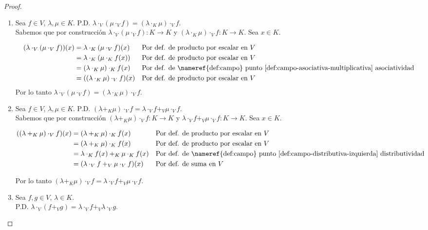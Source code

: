 \begin{proof}
\begin{enumerate}
        \item Sea $f \in V$, $\lambda, \mu \in K$. P.D. $\lambda \cdot_V (\mu \cdot_V f) = (\lambda \cdot_K \mu) \cdot_V f$.\\
        Sabemos que por construcción $\lambda \cdot_V (\mu \cdot_V f): K \rightarrow K$ y $(\lambda \cdot_K \mu) \cdot_V f: K \rightarrow K$. Sea $x \in K$.

        \begin{align*}
            (\lambda \cdot_V (\mu \cdot_V f))(x)  &= \lambda \cdot_K (\mu \cdot_V f)(x) && \text{Por def. de producto por escalar en $V$} \\
            &= \lambda \cdot_K (\mu \cdot_K f(x)) && \text{Por def. de producto por escalar en $V$} \\
            &= (\lambda \cdot_K \mu) \cdot_K f(x) && \text{Por def. de \nameref{def:campo} punto \ref{def:campo-asociativa-multiplicativa} asociatividad} \\
            &= ((\lambda \cdot_K \mu) \cdot_V f)(x) && \text{Por def. de producto por escalar en $V$}
        \end{align*}
        Por lo tanto $\lambda \cdot_V (\mu \cdot_V f) = (\lambda \cdot_K \mu) \cdot_V f$.


        \item Sea $f \in V$, $\lambda, \mu \in K$. P.D. $(\lambda +_K \mu) \cdot_V f = \lambda \cdot_V f +_V \mu \cdot_V f$.\\
        Sabemos que por construcción $(\lambda +_K \mu) \cdot_V f: K \rightarrow K$ y $\lambda \cdot_V f +_V \mu \cdot_V f: K \rightarrow K$. Sea $x \in K$.

        \begin{align*}
            ((\lambda +_K \mu) \cdot_V f)(x) &= (\lambda +_K \mu) \cdot_K f(x) && \text{Por def. de producto por escalar en $V$} \\
            &= (\lambda +_K \mu) \cdot_K f(x) && \text{Por def. de producto por escalar en $V$} \\
            &= \lambda \cdot_K f(x) +_K \mu \cdot_K f(x) && \text{Por def. de \nameref{def:campo} punto \ref{def:campo-distributiva-izquierda} distributividad} \\
            &= (\lambda \cdot_V f +_V \mu \cdot_V f)(x) && \text{Por def. de suma en $V$}
        \end{align*}

        Por lo tanto $(\lambda +_K \mu) \cdot_V f = \lambda \cdot_V f +_V \mu \cdot_V f$.


        \item Sea $f,g \in V$, $\lambda \in K$. \\
        P.D. $\lambda \cdot_V (f +_V g) = \lambda \cdot_V f +_V \lambda \cdot_V g$.\\


\end{enumerate}
\end{proof}
